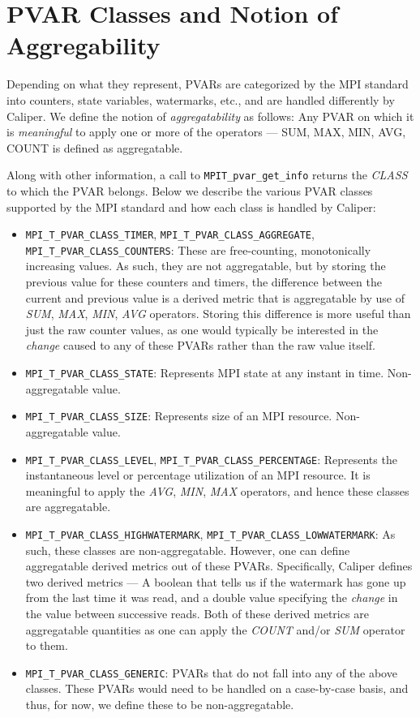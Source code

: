 \section{PVAR Classes and Notion of Aggregability}
Depending on what they represent, PVARs are categorized by the MPI standard into counters, state variables, watermarks, etc., and are handled differently by Caliper. We define the notion of \textit{aggregatability} as follows: Any PVAR on which it is \emph{meaningful} to apply one or more of the operators --- SUM, MAX, MIN, AVG, COUNT is defined as aggregatable.
\par Along with other information, a call to \verb+MPIT_pvar_get_info+ returns the \emph{CLASS} to which the PVAR belongs. Below we describe the various PVAR classes supported by the MPI standard and how each class is handled by Caliper:
\begin{itemize}
	\item \verb+MPI_T_PVAR_CLASS_TIMER+, \verb+MPI_T_PVAR_CLASS_AGGREGATE+, \verb+MPI_T_PVAR_CLASS_COUNTERS+: These are free-counting, monotonically increasing values. As such, they are not aggregatable, but by storing the previous value for these counters and timers, the difference between the current and previous value is a derived metric that is aggregatable by use of \emph{SUM}, \emph{MAX}, \emph{MIN}, \emph{AVG} operators. Storing this difference is more useful than just the raw counter values, as one would typically be interested in the \emph{change} caused to any of these PVARs rather than the raw value itself.
	\item \verb+MPI_T_PVAR_CLASS_STATE+: Represents MPI state at any instant in time. Non-aggregatable value.
	\item \verb+MPI_T_PVAR_CLASS_SIZE+: Represents size of an MPI resource. Non-aggregatable value.
	\item \verb+MPI_T_PVAR_CLASS_LEVEL+, \verb+MPI_T_PVAR_CLASS_PERCENTAGE+: Represents the instantaneous level or percentage utilization of an MPI resource. It is meaningful to apply the \emph{AVG}, \emph{MIN}, \emph{MAX} operators, and hence these classes are aggregatable.
	\item \verb+MPI_T_PVAR_CLASS_HIGHWATERMARK+, \verb+MPI_T_PVAR_CLASS_LOWWATERMARK+: As such, these classes are non-aggregatable. However, one can define aggregatable derived metrics out of these PVARs. Specifically, Caliper defines two derived metrics --- A boolean that tells us if the watermark has gone up from the last time it was read, and a double value specifying the \emph{change} in the value between successive reads. Both of these derived metrics are aggregatable quantities as one can apply the \emph{COUNT} and/or \emph{SUM} operator to them.
	\item \verb+MPI_T_PVAR_CLASS_GENERIC+: PVARs that do not fall into any of the above classes. These PVARs would need to be handled on a case-by-case basis, and thus, for now, we define these to be non-aggregatable.
\end{itemize}

